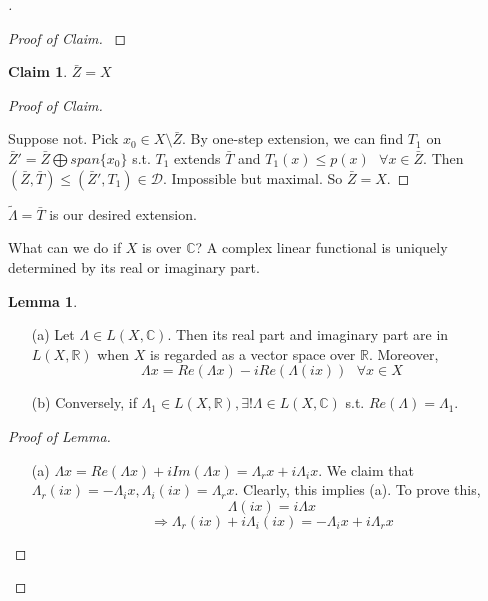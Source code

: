 \documentclass{article}
\theoremstyle{definition}
\newtheorem{lem}{Lemma}
\newtheorem*{clm}{Claim}
\newenvironment{proofs}[1][\proofname]{%
  \begin{proof}[#1]$ $\par\nobreak\ignorespaces
}{%
  \end{proof}
}
\newcommand{\sfa}{\text{  } \forall}
\begin{document}
\begin{proofs}
\begin{proofs}[Proof of Claim]
	\end{proofs}
	
		\begin{clm}
			$\bar{Z} = X$
		\end{clm}

		\begin{proofs}[Proof of Claim]
			Suppose not.
			Pick $x_0 \in X \setminus \bar{Z}$.
			By one-step extension, we can find $T_1$ on $\bar{Z}' = \bar{Z} \bigoplus  span\{x_0\}$ s.t. $T_1$ extends $\bar{T}$ and $T_1(x) \leq p(x) \sfa x \in \bar{Z}$.
			Then $(\bar{Z}, \bar{T}) \leq (\bar{Z}', T_1) \in \mathcal{D}$.
			Impossible but maximal.
			So $\bar{Z} = X$.
		\end{proofs}
		$\tilde{\Lambda} = \bar{T}$ is our desired extension.
		\par What can we do if $X$ is over $\mathbb{C}$?
		A complex linear functional is uniquely determined by its real or imaginary part. 
		
		\begin{lem}
			\begin{enumerate}
				\item[(a)] Let $\Lambda \in L(X, \mathbb{C})$. 
					Then its real part and imaginary part are in $L(X, \mathbb{R})$ when $X$ is regarded as a vector space over $\mathbb{R}$.
					Moreover, 
					\[
						\Lambda x = Re(\Lambda x) - i Re(\Lambda(ix)) \sfa x \in X
					\]

				\item[(b)] Conversely, if $\Lambda_1 \in L(X, \mathbb{R}), \exists ! \Lambda \in L(X, \mathbb{C})$ s.t. $Re(\Lambda) = \Lambda_1$.
			\end{enumerate}
		\end{lem}

		\begin{proofs}[Proof of Lemma]
			\begin{enumerate}
				\item[(a)] $\Lambda x = Re(\Lambda x) + i Im(\Lambda x)= \Lambda_r x + i \Lambda_i x$.
					We claim that $\Lambda_r(ix) = - \Lambda_i x, \Lambda_i(ix) = \Lambda_r x$.
					Clearly, this implies (a).
					To prove this, 
					\[
						\Lambda(ix) = i \Lambda x
					\]
					\[
						\Rightarrow \Lambda_r(ix) + i \Lambda_i(ix) = -\Lambda_i x + i \Lambda_r x
					\]


\end{enumerate}
\end{proofs}
\end{proofs}
\end{document}
